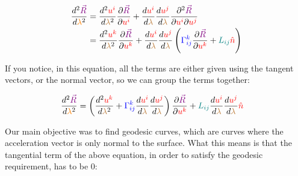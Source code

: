 \begin{align*}
    \frac{d^2\begingroup\color{violet}\vec{R}\endgroup}{d\begingroup\color{orange}\lambda\endgroup^2} &=
    \frac{d^2 \begingroup\color{red}u^i\endgroup}{d\begingroup\color{brown}\lambda\endgroup^2}\frac{\partial \begingroup\color{violet}\vec{R}\endgroup}{\partial \begingroup\color{red}u^i\endgroup} 
    + \frac{d \begingroup\color{red}u^i\endgroup}{d\begingroup\color{brown}\lambda\endgroup}\frac{d\begingroup\color{red}u^j\endgroup}{d\begingroup\color{brown}\lambda\endgroup} \frac{\partial^2 \begingroup\color{violet}\vec{R}\endgroup}{\partial \begingroup\color{red}u^i\endgroup \partial\begingroup\color{red}u^j\endgroup}\\
    &= \frac{d^2 \begingroup\color{red}u^k\endgroup}{d\begingroup\color{brown}\lambda\endgroup^2}\frac{\partial \begingroup\color{violet}\vec{R}\endgroup}{\partial \begingroup\color{red}u^k\endgroup} 
    + \frac{d \begingroup\color{red}u^i\endgroup}{d\begingroup\color{brown}\lambda\endgroup}\frac{d\begingroup\color{red}u^j\endgroup}{d\begingroup\color{brown}\lambda\endgroup} \left(\begingroup\color{blue}\Gamma^{k}_{ij}\endgroup \frac{\partial \begingroup\color{violet}\vec{R}\endgroup}{\partial \begingroup\color{red}u^k\endgroup} + \begingroup\color{teal}L_{ij}\endgroup \begingroup\color{red}\hat{n}\endgroup\right)
\end{align*}

If you notice, in this equation, all the terms are either given using the tangent vectors, or the normal vector, so we can group the terms together:

\begin{align*}
    \frac{d^2\begingroup\color{violet}\vec{R}\endgroup}{d\begingroup\color{orange}\lambda\endgroup^2} &=
    \left(\frac{d^2 \begingroup\color{red}u^k\endgroup}{d\begingroup\color{brown}\lambda\endgroup^2} + \begingroup\color{blue}\Gamma^{k}_{ij}\endgroup \frac{d \begingroup\color{red}u^i\endgroup}{d\begingroup\color{brown}\lambda\endgroup} \frac{d \begingroup\color{red}u^j\endgroup}{d\begingroup\color{brown}\lambda\endgroup}\right) \frac{\partial \begingroup\color{violet}\vec{R}\endgroup}{\partial \begingroup\color{red}u^k\endgroup}
    + \begingroup\color{teal}L_{ij}\endgroup \frac{d \begingroup\color{red}u^i\endgroup}{d\begingroup\color{brown}\lambda\endgroup} \frac{d \begingroup\color{red}u^j\endgroup}{d\begingroup\color{brown}\lambda\endgroup} \begingroup\color{red}\hat{n}\endgroup
\end{align*}

Our main objective was to find geodesic curves, which are curves where the acceleration vector is only normal to the surface. What this means is that the tangential term of the above
equation, in order to satisfy the geodesic requirement, has to be 0:

